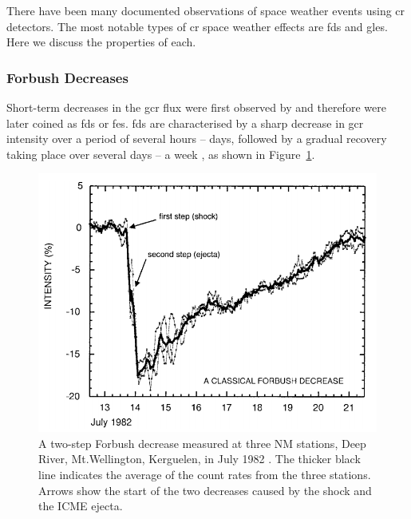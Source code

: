 There have been many documented observations of space weather events using \gls{cr} detectors. The most notable types of \gls{cr} space weather effects are \glspl{fd} and \glspl{gle}. Here we discuss the properties of each.

\subsubsection*{Forbush Decreases}\label{sec:intro_FDs}

Short-term decreases in the \gls{gcr} flux were first observed by  \citet{forbush_effects_1937} and therefore were later coined as \glspl{fd} or \glspl{fe}. \glspl{fd} are characterised by a sharp decrease in \gls{gcr} intensity over a period of several hours -- days, followed by a gradual recovery taking place over several days -- a week \citep{cane_coronal_2000, belov_forbush_2008, wawrzynczak_modeling_2010}, as shown in Figure~\ref{fig:FD_plot}.

\begin{figure}[ht!]
	\centering
	\includegraphics[width=0.75\columnwidth]{FD_plot.png}
	\caption{A two-step Forbush decrease measured at three NM stations, Deep River, Mt.Wellington, Kerguelen, in July 1982 \citep{cane_coronal_2000}. The thicker black line indicates the average of the count rates from the three stations. Arrows show the start of the two decreases caused by the shock and the ICME ejecta.}
	\label{fig:FD_plot}
\end{figure}

